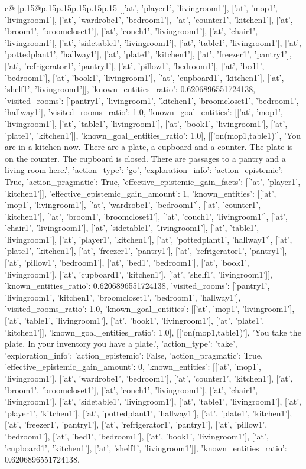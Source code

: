 \documentclass{article}
\begin{document}
{\begin{supertabular}{c@{$\;$}|p{.15\linewidth}@{}p{.15\linewidth}p{.15\linewidth}p{.15\linewidth}p{.15\linewidth}p{.15\linewidth}}
{{{[['at', 'player1', 'livingroom1'], ['at', 'mop1', 'livingroom1'], ['at', 'wardrobe1', 'bedroom1'], ['at', 'counter1', 'kitchen1'], ['at', 'broom1', 'broomcloset1'], ['at', 'couch1', 'livingroom1'], ['at', 'chair1', 'livingroom1'], ['at', 'sidetable1', 'livingroom1'], ['at', 'table1', 'livingroom1'], ['at', 'pottedplant1', 'hallway1'], ['at', 'plate1', 'kitchen1'], ['at', 'freezer1', 'pantry1'], ['at', 'refrigerator1', 'pantry1'], ['at', 'pillow1', 'bedroom1'], ['at', 'bed1', 'bedroom1'], ['at', 'book1', 'livingroom1'], ['at', 'cupboard1', 'kitchen1'], ['at', 'shelf1', 'livingroom1']], 'known_entities_ratio': 0.6206896551724138, 'visited_rooms': ['pantry1', 'livingroom1', 'kitchen1', 'broomcloset1', 'bedroom1', 'hallway1'], 'visited_rooms_ratio': 1.0, 'known_goal_entities': [['at', 'mop1', 'livingroom1'], ['at', 'table1', 'livingroom1'], ['at', 'book1', 'livingroom1'], ['at', 'plate1', 'kitchen1']], 'known_goal_entities_ratio': 1.0}}], [['on(mop1,table1)'], 'You are in a kitchen now. There are a plate, a cupboard and a counter. The plate is on the counter. The cupboard is closed. There are passages to a pantry and a living room here.', {'action_type': 'go', 'exploration_info': {'action_epistemic': True, 'action_pragmatic': True, 'effective_epistemic_gain_facts': [['at', 'player1', 'kitchen1']], 'effective_epistemic_gain_amount': 1, 'known_entities': [['at', 'mop1', 'livingroom1'], ['at', 'wardrobe1', 'bedroom1'], ['at', 'counter1', 'kitchen1'], ['at', 'broom1', 'broomcloset1'], ['at', 'couch1', 'livingroom1'], ['at', 'chair1', 'livingroom1'], ['at', 'sidetable1', 'livingroom1'], ['at', 'table1', 'livingroom1'], ['at', 'player1', 'kitchen1'], ['at', 'pottedplant1', 'hallway1'], ['at', 'plate1', 'kitchen1'], ['at', 'freezer1', 'pantry1'], ['at', 'refrigerator1', 'pantry1'], ['at', 'pillow1', 'bedroom1'], ['at', 'bed1', 'bedroom1'], ['at', 'book1', 'livingroom1'], ['at', 'cupboard1', 'kitchen1'], ['at', 'shelf1', 'livingroom1']], 'known_entities_ratio': 0.6206896551724138, 'visited_rooms': ['pantry1', 'livingroom1', 'kitchen1', 'broomcloset1', 'bedroom1', 'hallway1'], 'visited_rooms_ratio': 1.0, 'known_goal_entities': [['at', 'mop1', 'livingroom1'], ['at', 'table1', 'livingroom1'], ['at', 'book1', 'livingroom1'], ['at', 'plate1', 'kitchen1']], 'known_goal_entities_ratio': 1.0}}], [['on(mop1,table1)'], 'You take the plate. In your inventory you have a plate.', {'action_type': 'take', 'exploration_info': {'action_epistemic': False, 'action_pragmatic': True, 'effective_epistemic_gain_amount': 0, 'known_entities': [['at', 'mop1', 'livingroom1'], ['at', 'wardrobe1', 'bedroom1'], ['at', 'counter1', 'kitchen1'], ['at', 'broom1', 'broomcloset1'], ['at', 'couch1', 'livingroom1'], ['at', 'chair1', 'livingroom1'], ['at', 'sidetable1', 'livingroom1'], ['at', 'table1', 'livingroom1'], ['at', 'player1', 'kitchen1'], ['at', 'pottedplant1', 'hallway1'], ['at', 'plate1', 'kitchen1'], ['at', 'freezer1', 'pantry1'], ['at', 'refrigerator1', 'pantry1'], ['at', 'pillow1', 'bedroom1'], ['at', 'bed1', 'bedroom1'], ['at', 'book1', 'livingroom1'], ['at', 'cupboard1', 'kitchen1'], ['at', 'shelf1', 'livingroom1']], 'known_entities_ratio': 0.6206896551724138, }}}
\end{supertabular}}
\end{document}
